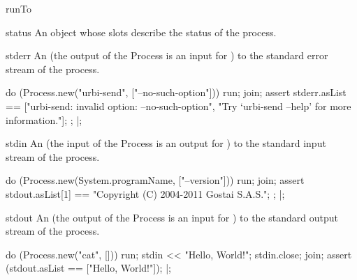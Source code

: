\begin{urbiscriptapi}
\item[runTo]


\item[status] An object whose slots describe the status of the
  process.


\item[stderr] An  (the output of the Process is
  an input for \urbi) to the standard error stream of the process.
\begin{urbiscript}
do (Process.new("urbi-send", ["--no-such-option"]))
{
  run;
  join;
  assert
  {
    stderr.asList ==
    ["urbi-send: invalid option: --no-such-option",
     "Try `urbi-send --help' for more information."];
  };
}|;
\end{urbiscript}


\item[stdin] An  (the input of the Process is
  an output for \urbi) to the standard input stream of the process.
\begin{urbiscript}
do (Process.new(System.programName, ["--version"]))
{
  run;
  join;
  assert
  {
    stdout.asList[1] == "Copyright (C) 2004-2011 Gostai S.A.S.";
  };
}|;
\end{urbiscript}


\item[stdout] An  (the output of the Process is
  an input for \urbi) to the standard output stream of the process.
\begin{urbiscript}
do (Process.new("cat", []))
{
  run;
  stdin << "Hello, World!\n";
  stdin.close;
  join;
  assert (stdout.asList == ["Hello, World!"]);
}|;
\end{urbiscript}
\end{urbiscriptapi}


